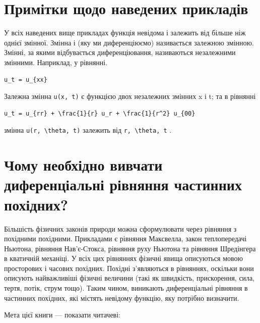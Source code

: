 \documentclass[
  ukrainian,
]{article}
\begin{document}
\section{Примітки щодо наведених
прикладів}\label{ux43fux440ux438ux43cux456ux442ux43aux438-ux449ux43eux434ux43e-ux43dux430ux432ux435ux434ux435ux43dux438ux445-ux43fux440ux438ux43aux43bux430ux434ux456ux432}

У всіх наведених вище прикладах функція невідома і залежить від більше
ніж однієї змінної. Змінна і (яку ми диференціюємо) називається залежною
змінною. Змінні, за якими відбувається диференціювання, називаються
незалежними змінними. Наприклад, у рівнянні.

\begin{verbatim}
u_t = u_{xx}
\end{verbatim}

Залежна змінна \texttt{u(x,\ t)} є функцією двох незалежних змінних x і
t; та в рівнянні

\begin{verbatim}
u_t = u_{rr} + \frac{1}{r} u_r + \frac{1}{r^2} u_{00}
\end{verbatim}

змінна \texttt{u(r,\ \textbackslash{}theta,\ t)} залежить від
\texttt{r,\ \textbackslash{}theta,\ t} .

\section{Чому необхідно вивчати диференціальні рівняння частинних
похідних?}\label{ux447ux43eux43cux443-ux43dux435ux43eux431ux445ux456ux434ux43dux43e-ux432ux438ux432ux447ux430ux442ux438-ux434ux438ux444ux435ux440ux435ux43dux446ux456ux430ux43bux44cux43dux456-ux440ux456ux432ux43dux44fux43dux43dux44f-ux447ux430ux441ux442ux438ux43dux43dux438ux445-ux43fux43eux445ux456ux434ux43dux438ux445}

Більшість фізичних законів природи можна сформулювати через рівняння з
похідними похідними. Прикладами є рівняння Максвелла, закон
теплопередачі Ньютона, рівняння Нав'є-Стокса, рівняння руху Ньютона та
рівняння Шредінгера в кватичній механіці. У всіх цих рівняннях фізичні
явища описуються мовою просторових і часових похідних. Похідні
з'являються в рівняннях, оскільки вони описують найважливіші фізичні
величини (такі як швидкість, прискорення, сила, тертя, потік, струм
тощо). Таким чином, виникають диференціальні рівняння в частинних
похідних, які містять невідому функцію, яку потрібно визначити.

Мета цієї книги --- показати читачеві:
\end{document}
